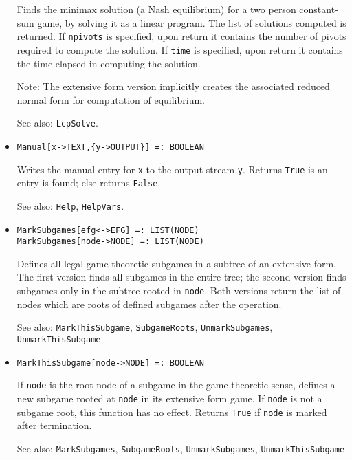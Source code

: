 \begin{itemize}
\bd
Finds the minimax solution (a Nash equilibrium) for a
two person constant-sum game, by solving it as a linear program.
The list of solutions computed is returned.  If \verb+npivots+ is
specified, upon return it contains the number of pivots required to
compute the solution.  If \verb+time+ is specified, upon return it
contains the time elapsed in computing the solution.
\item
[Note:] The extensive form version implicitly creates the associated
reduced normal form for computation of equilibrium.
\item
[See also:] {\tt LcpSolve}.
\ed


\item
\protect \large \begin{verbatim}
Manual[x->TEXT,{y->OUTPUT}] =: BOOLEAN
\end{verbatim} \normalsize

\bd Writes the manual entry for \verb+x+ to the output stream
\verb+y+.  Returns \verb+True+ is an entry is found; else returns
\verb+False+.
\item
[See also:] {\tt Help}, {\tt HelpVars}.
\ed

\item
\protect \large \begin{verbatim}
MarkSubgames[efg<->EFG] =: LIST(NODE)
MarkSubgames[node->NODE] =: LIST(NODE)
\end{verbatim} \normalsize

\bd
Defines all legal game theoretic subgames in a subtree of an extensive
form.  The first version finds all subgames in the entire tree; the
second version finds subgames only in the subtree rooted in \verb+node+.
Both versions return the list of nodes which are roots of defined
subgames after the operation.
\item
[See also:] {\tt MarkThisSubgame}, {\tt SubgameRoots}, {\tt UnmarkSubgames},
{\tt UnmarkThisSubgame}
\ed

\item
\protect \large \begin{verbatim}
MarkThisSubgame[node->NODE] =: BOOLEAN
\end{verbatim}\normalsize

\bd
If \verb+node+ is the root node of a subgame in the game theoretic
sense, defines a new subgame rooted at \verb+node+ in its extensive
form game.  If \verb+node+ is not a subgame root, this function has
no effect.  Returns \verb+True+ if \verb+node+ is marked after termination.
\item
[See also:] {\tt MarkSubgames}, {\tt SubgameRoots}, {\tt UnmarkSubgames},
{\tt UnmarkThisSubgame}
\ed


\end{itemize}
